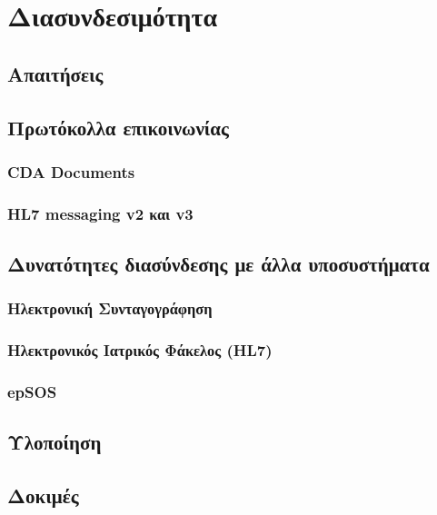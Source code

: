\chapter{Διασυνδεσιμότητα}\label{ch:Interoperability}
\section{Απαιτήσεις}
\section{Πρωτόκολλα επικοινωνίας}
	\subsection{CDA Documents}
	\subsection{HL7 messaging v2 και v3}
		
\section{Δυνατότητες διασύνδεσης με άλλα υποσυστήματα}
	\subsection{Ηλεκτρονική Συνταγογράφηση}
	\subsection{Ηλεκτρονικός Ιατρικός Φάκελος (HL7)}
	\subsection{epSOS}

\section{Υλοποίηση}
\section{Δοκιμές}
